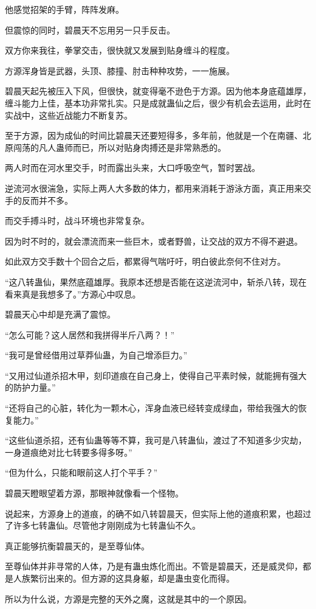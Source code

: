 \begin{this_body}
他感觉招架的手臂，阵阵发麻。

但震惊的同时，碧晨天不忘用另一只手反击。

双方你来我往，拳掌交击，很快就又发展到贴身缠斗的程度。

方源浑身皆是武器，头顶、膝撞、肘击种种攻势，一一施展。

碧晨天起先被压入下风，但很快，就变得毫不逊色于方源。因为他本身底蕴雄厚，缠斗能力上佳，基本功非常扎实。只是成就蛊仙之后，很少有机会去运用，此时在实战中，这些近战能力不断复苏。

至于方源，因为成仙的时间比碧晨天还要短得多，多年前，他就是一个在南疆、北原闯荡的凡人蛊师而已，所以对贴身肉搏还是非常熟悉的。

两人时而在河水里交手，时而露出头来，大口呼吸空气，暂时罢战。

逆流河水很湍急，实际上两人大多数的体力，都用来消耗于游泳方面，真正用来交手的反而并不多。

而交手搏斗时，战斗环境也非常复杂。

因为时不时的，就会漂流而来一些巨木，或者野兽，让交战的双方不得不避退。

如此双方交手数十个回合之后，都累得气喘吁吁，明白彼此奈何不住对方。

“这八转蛊仙，果然底蕴雄厚。我原本还想是否能在这逆流河中，斩杀八转，现在看来真是我想多了。”方源心中叹息。

碧晨天心中却是充满了震惊。

“怎么可能？这人居然和我拼得半斤八两？！”

“我可是曾经借用过草莽仙蛊，为自己增添巨力。”

“又用过仙道杀招木甲，刻印道痕在自己身上，使得自己平素时候，就能拥有强大的防护力量。”

“还将自己的心脏，转化为一颗木心，浑身血液已经转变成绿血，带给我强大的恢复能力。”

“这些仙道杀招，还有仙蛊等等不算，我可是八转蛊仙，渡过了不知道多少灾劫，一身道痕绝对比七转要多得多呀。”

“但为什么，只能和眼前这人打个平手？”

碧晨天瞪眼望着方源，那眼神就像看一个怪物。

说起来，方源身上的道痕，的确不如八转碧晨天，但实际上他的道痕积累，也超过了许多七转蛊仙。尽管他才刚刚成为七转蛊仙不久。

真正能够抗衡碧晨天的，是至尊仙体。

至尊仙体并非寻常的人体，乃是有蛊虫炼化而出。不管是碧晨天，还是威灵仰，都是人族繁衍出来的。但方源的这具身躯，却是蛊虫变化而得。

所以为什么说，方源是完整的天外之魔，这就是其中的一个原因。


\end{this_body}
